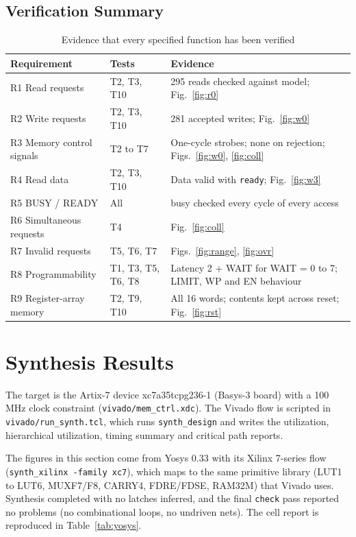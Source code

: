 \documentclass[11pt,a4paper]{article}
\newcommand{\sig}[1]{\texttt{#1}}
\begin{document}
\subsection{Verification Summary}
\begin{table}[H]
\centering
\caption{Evidence that every specified function has been verified}
\label{tab:cov}
\small
\begin{tabularx}{\textwidth}{@{}l l X@{}}
\toprule
\textbf{Requirement} & \textbf{Tests} & \textbf{Evidence} \\
\midrule
R1 Read requests & T2, T3, T10 & 295 reads checked against model; Fig.~\ref{fig:r0} \\
R2 Write requests & T2, T3, T10 & 281 accepted writes; Fig.~\ref{fig:w0} \\
R3 Memory control signals & T2 to T7 & One-cycle strobes; none on rejection; Figs.~\ref{fig:w0}, \ref{fig:coll} \\
R4 Read data & T2, T3, T10 & Data valid with \sig{ready}; Fig.~\ref{fig:w3} \\
R5 BUSY / READY & All & busy checked every cycle of every access \\
R6 Simultaneous requests & T4 & Fig.~\ref{fig:coll} \\
R7 Invalid requests & T5, T6, T7 & Figs.~\ref{fig:range}, \ref{fig:ovr} \\
R8 Programmability & T1, T3, T5, T6, T8 & Latency 2 + WAIT for WAIT = 0 to 7; LIMIT, WP and EN behaviour \\
R9 Register-array memory & T2, T9, T10 & All 16 words; contents kept across reset; Fig.~\ref{fig:rst} \\
\bottomrule
\end{tabularx}
\end{table}

\section{Synthesis Results}
\label{sec:synth}
The target is the Artix-7 device xc7a35tcpg236-1 (Basys-3 board) with a 100 MHz clock constraint (\sig{vivado/mem\_ctrl.xdc}). The Vivado flow is scripted in \sig{vivado/run\_synth.tcl}, which runs \sig{synth\_design} and writes the utilization, hierarchical utilization, timing summary and critical path reports.

The figures in this section come from Yosys 0.33 with its Xilinx 7-series flow (\sig{synth\_xilinx -family xc7}), which maps to the same primitive library (LUT1 to LUT6, MUXF7/F8, CARRY4, FDRE/FDSE, RAM32M) that Vivado uses. Synthesis completed with no latches inferred, and the final \sig{check} pass reported no problems (no combinational loops, no undriven nets). The cell report is reproduced in Table~\ref{tab:yosys}.
\end{document}
